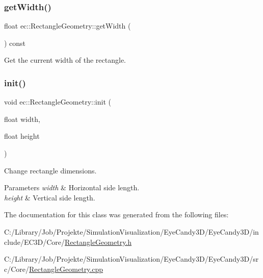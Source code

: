 \mbox{\label{classec_1_1_rectangle_geometry_a1f75cd7d531e23fe3ccaff67178e0a08}} 
\subsubsection{\texorpdfstring{get\+Width()}{getWidth()}}
{\footnotesize\ttfamily float ec\+::\+Rectangle\+Geometry\+::get\+Width (\begin{DoxyParamCaption}{ }\end{DoxyParamCaption}) const}



Get the current width of the rectangle. 

\mbox{\label{classec_1_1_rectangle_geometry_ac6dd804a2fa2b253b71408dae5a08265}} 
\subsubsection{\texorpdfstring{init()}{init()}}
{\footnotesize\ttfamily void ec\+::\+Rectangle\+Geometry\+::init (\begin{DoxyParamCaption}\item[{float}]{width,  }\item[{float}]{height }\end{DoxyParamCaption})}



Change rectangle dimensions. 


\begin{DoxyParams}{Parameters}
{\em width} & Horizontal side length. \\
\hline
{\em height} & Vertical side length. \\
\hline
\end{DoxyParams}


The documentation for this class was generated from the following files\+:\begin{DoxyCompactItemize}
\item 
C\+:/\+Library/\+Job/\+Projekte/\+Simulation\+Visualization/\+Eye\+Candy3\+D/\+Eye\+Candy3\+D/include/\+E\+C3\+D/\+Core/\mbox{\hyperlink{_rectangle_geometry_8h}{Rectangle\+Geometry.\+h}}\item 
C\+:/\+Library/\+Job/\+Projekte/\+Simulation\+Visualization/\+Eye\+Candy3\+D/\+Eye\+Candy3\+D/src/\+Core/\mbox{\hyperlink{_rectangle_geometry_8cpp}{Rectangle\+Geometry.\+cpp}}\end{DoxyCompactItemize}

